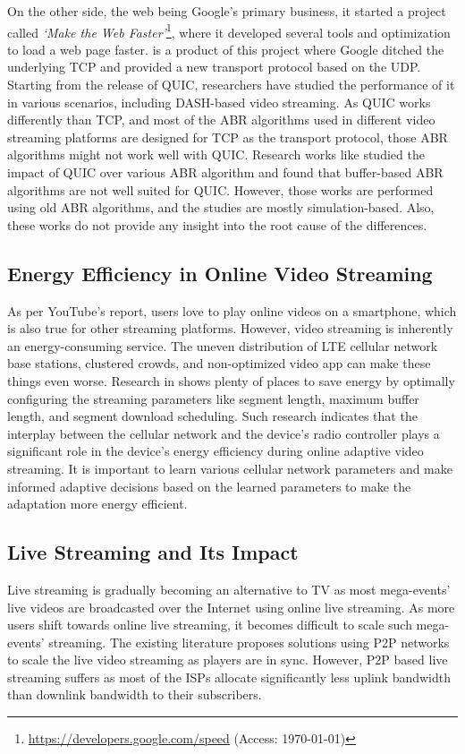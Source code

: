On the other side, the web being Google's primary business, it started a project called \textit{`Make the Web Faster'}\footnote{\url{https://developers.google.com/speed} (Access: \today)}, where it developed several tools and optimization to load a web page faster. \cite{langley2017quic} is a product of this project where Google ditched the underlying \ac{TCP} and provided a new transport protocol based on the \ac{UDP}. Starting from the release of \ac{QUIC}, researchers have studied the performance of it in various scenarios, including \ac{DASH}-based video streaming. As \ac{QUIC} works differently than \ac{TCP}, and most of the \ac{ABR} algorithms used in different video streaming platforms are designed for \ac{TCP} as the transport protocol, those \ac{ABR} algorithms might not work well with \ac{QUIC}. Research works like \cite{bhat2018improving,van2018empirical} studied the impact of \ac{QUIC} over various \ac{ABR} algorithm and found that buffer-based \ac{ABR} algorithms are not well suited for \ac{QUIC}. However, those works are performed using old \ac{ABR} algorithms, and the studies are mostly simulation-based. Also, these works do not provide any insight into the root cause of the differences.

\subsection{Energy Efficiency in Online Video Streaming}
As per YouTube's report, users love to play online videos on a smartphone, which is also true for other streaming platforms. However, video streaming is inherently an energy-consuming service. The uneven distribution of \ac{LTE} cellular network base stations, clustered crowds, and non-optimized video app can make these things even worse. Research in \cite{10.1145/2910018.2910656} shows plenty of places to save energy by optimally configuring the streaming parameters like segment length, maximum buffer length, and segment download scheduling. Such research indicates that the interplay between the cellular network and the device's radio controller plays a significant role in the device's energy efficiency during online adaptive video streaming. It is important to learn various cellular network parameters and make informed adaptive decisions based on the learned parameters to make the adaptation more energy efficient.

\subsection{Live Streaming and Its Impact}
Live streaming is gradually becoming an alternative to \ac{TV} as most mega-events' live videos are broadcasted over the Internet using online live streaming. As more users shift towards online live streaming, it becomes difficult to scale such mega-events' streaming. The existing literature proposes solutions using \ac{P2P} networks to scale the live video streaming as players are in sync. However, \ac{P2P} based live streaming suffers as most of the \acp{ISP} allocate significantly less uplink bandwidth than downlink bandwidth to their subscribers. 

